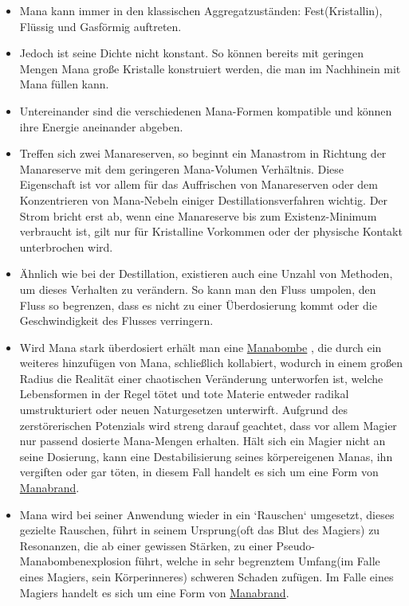 \documentclass[a4paper,12pt,oneside]{book}
\begin{document}
\begin{itemize}
\item Mana kann immer in den klassischen Aggregatzuständen: Fest(Kristallin), Flüssig und Gasförmig auftreten. 
\item Jedoch ist seine Dichte nicht konstant. So können bereits mit geringen Mengen Mana große Kristalle konstruiert werden, die man im Nachhinein mit Mana füllen kann.
\item Untereinander sind die verschiedenen Mana-Formen kompatible und können ihre Energie aneinander abgeben.
\item Treffen sich zwei Manareserven, so beginnt ein Manastrom in Richtung der Manareserve mit dem geringeren Mana-Volumen Verhältnis. Diese Eigenschaft ist vor allem für das Auffrischen von Manareserven oder dem Konzentrieren von Mana-Nebeln einiger Destillationsverfahren wichtig. Der Strom bricht erst ab, wenn eine Manareserve bis zum Existenz-Minimum verbraucht ist, gilt nur für Kristalline Vorkommen oder der physische Kontakt unterbrochen wird.
\item Ähnlich wie bei der Destillation, existieren auch eine Unzahl von Methoden, um dieses Verhalten zu verändern. So kann man den Fluss umpolen, den Fluss so begrenzen, dass es nicht zu einer Überdosierung kommt oder die Geschwindigkeit des Flusses verringern.
\item Wird Mana stark überdosiert erhält man eine \uline{Manabombe}  \label{Manabombe}
, die durch ein weiteres hinzufügen von Mana, schließlich kollabiert, wodurch in einem großen Radius die Realität einer chaotischen Veränderung unterworfen ist, welche Lebensformen in der Regel tötet und tote Materie entweder radikal umstrukturiert oder neuen Naturgesetzen unterwirft. Aufgrund des zerstörerischen Potenzials wird streng darauf geachtet, dass vor allem Magier nur passend dosierte Mana-Mengen erhalten. Hält sich ein Magier nicht an seine Dosierung, kann eine Destabilisierung seines körpereigenen Manas, ihn vergiften oder gar töten, in diesem Fall handelt es sich um eine Form von \uline{Manabrand}. 
\item Mana wird bei seiner Anwendung wieder in ein `Rauschen` umgesetzt, dieses gezielte Rauschen, führt in seinem Ursprung(oft das Blut des Magiers) zu Resonanzen, die ab einer gewissen Stärken, zu einer Pseudo-Manabombenexplosion führt, welche in sehr begrenztem Umfang(im Falle eines Magiers, sein Körperinneres) schweren Schaden zufügen. Im Falle eines Magiers handelt es sich um eine Form von \uline{Manabrand}.  
\end{itemize} 
\end{document}
